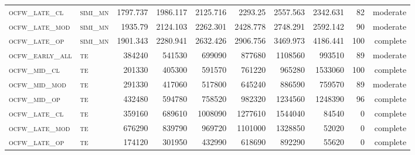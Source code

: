 \begin{landscape}
\begin{center}
\begin{footnotesize}
\begin{longtable}{llrrrrr|rrr}
\textsc{ocfw\_late\_cl  } & \textsc{simi\_mn  }    & 1797.737 & 1986.117 & 2125.716 & 2293.25  & 2557.563   & 2342.631      & 82            & moderate        \\
\textsc{ocfw\_late\_mod } & \textsc{simi\_mn  }    & 1935.79  & 2124.103 & 2262.301 & 2428.778 & 2748.291   & 2592.142      & 90            & moderate        \\
\textsc{ocfw\_late\_op  } & \textsc{simi\_mn  }    & 1901.343 & 2280.941 & 2632.426 & 2906.756 & 3469.973   & 4186.441      & 100           & complete             \\
\textsc{ocfw\_early\_all} & \textsc{te  	  }    & 384240   & 541530   & 699090   & 877680   & 1108560    & 993510        & 89            & moderate        \\
\textsc{ocfw\_mid\_cl   } & \textsc{te        }    & 201330   & 405300   & 591570   & 761220   & 965280     & 1533060       & 100           & complete             \\
\textsc{ocfw\_mid\_mod  } & \textsc{te        }    & 291330   & 417060   & 517800   & 645240   & 886590     & 759570        & 89            & moderate        \\
\textsc{ocfw\_mid\_op   } & \textsc{te        }    & 432480   & 594780   & 758520   & 982320   & 1234560    & 1248390       & 96            & complete        \\
\textsc{ocfw\_late\_cl  } & \textsc{te        }    & 359160   & 689610   & 1008090  & 1277610  & 1544040    & 84540         & 0             & complete            \\
\textsc{ocfw\_late\_mod } & \textsc{te        }    & 676290   & 839790   & 969720   & 1101000  & 1328850    & 52020         & 0             & complete            \\
\textsc{ocfw\_late\_op  } & \textsc{te        }    & 174120   & 301950   & 432990   & 618690   & 892290     & 55620         & 0             & complete           

\end{longtable}
\end{footnotesize}
\end{center}
\end{landscape}

\restoregeometry
\pagestyle{headings}


